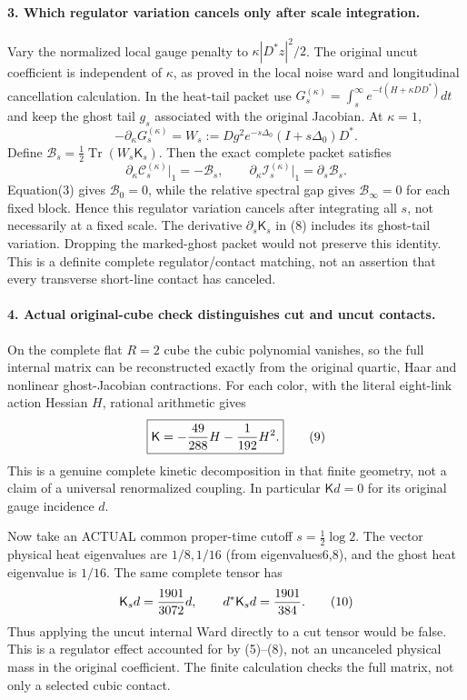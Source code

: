 \documentclass[11pt]{article}
\begin{document}
\paragraph{3. Which regulator variation cancels only after scale integration.}
Vary the normalized local gauge penalty to $\kappa|D^*z|^2/2$.
The original uncut coefficient is independent of $\kappa$, as proved in
the local noise ward and longitudinal cancellation calculation. In the heat-tail packet use
$G_s^{(\kappa)}=\int_s^\infty e^{-t(H+\kappa DD^*)}dt$ and keep the
ghost tail $g_s$ associated with the original Jacobian.
At $\kappa=1$,
\[
 -\partial_\kappa G_s^{(\kappa)}
 =W_s:=Dg^2e^{-s\Delta_0}(I+s\Delta_0)D^*.
\]
Define $\mathcal B_s=\tfrac12\operatorname{Tr}(W_s\mathsf K_s)$.
Then the exact complete packet satisfies
\[
 \partial_\kappa\mathcal C_s^{(\kappa)}\big|_1=-\mathcal B_s,
 \qquad
 \partial_\kappa\mathcal I_s^{(\kappa)}\big|_1=\partial_s\mathcal B_s.
                                                                    \tag{8}
\]
Equation(3) gives $\mathcal B_0=0$, while the relative spectral gap gives
$\mathcal B_\infty=0$ for each fixed block. Hence this regulator variation
cancels after integrating all $s$, not necessarily at a fixed scale.
The derivative $\partial_s\mathsf K_s$ in (8) includes its ghost-tail
variation. Dropping the marked-ghost packet would not preserve this
identity. This is a definite complete regulator/contact matching, not
an assertion that every transverse short-line contact has canceled.

\paragraph{4. Actual original-cube check distinguishes cut and uncut contacts.}
On the complete flat $R=2$ cube the cubic polynomial vanishes, so the
full internal matrix can be reconstructed exactly from the original
quartic, Haar and nonlinear ghost-Jacobian contractions. For each color,
with the literal eight-link action Hessian $H$, rational arithmetic gives
\[
 \boxed{\mathsf K=-{49\over288}H-{1\over192}H^2.}                \tag{9}
\]
This is a genuine complete kinetic decomposition in that finite geometry,
not a claim of a universal renormalized coupling. In particular
$\mathsf K d=0$ for its original gauge incidence $d$.

Now take an ACTUAL common proper-time cutoff
$s=\frac12\log2$. The vector physical heat eigenvalues are $1/8,1/16$
(from eigenvalues6,8), and the ghost heat eigenvalue is $1/16$.
The same complete tensor has
\[
 \mathsf K_s d={1901\over3072}d,\qquad
 d^*\mathsf K_s d={1901\over384}.                                \tag{10}
\]
Thus applying the uncut internal Ward directly to a cut tensor would
be false. This is a regulator effect accounted for by (5)--(8), not an
uncanceled physical mass in the original coefficient. The finite calculation checks the full matrix, not only a selected cubic contact.
\end{document}

